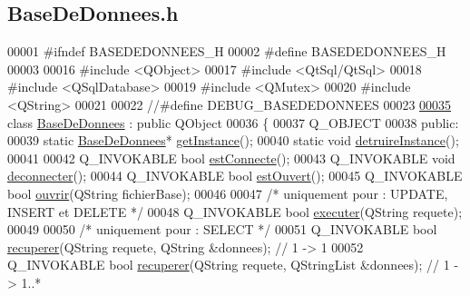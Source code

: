 \hypertarget{_base_de_donnees_8h_source}{}\subsection{Base\+De\+Donnees.\+h}
\label{_base_de_donnees_8h_source}

\begin{DoxyCode}
00001 \textcolor{preprocessor}{#ifndef BASEDEDONNEES\_H}
00002 \textcolor{preprocessor}{#define BASEDEDONNEES\_H}
00003 
00016 \textcolor{preprocessor}{#include <QObject>}
00017 \textcolor{preprocessor}{#include <QtSql/QtSql>}
00018 \textcolor{preprocessor}{#include <QSqlDatabase>}
00019 \textcolor{preprocessor}{#include <QMutex>}
00020 \textcolor{preprocessor}{#include <QString>}
00021 
00022 \textcolor{comment}{//#define DEBUG\_BASEDEDONNEES}
00023 
\hyperlink{class_base_de_donnees}{00035} \textcolor{keyword}{class }\hyperlink{class_base_de_donnees}{BaseDeDonnees} : \textcolor{keyword}{public} QObject
00036 \{
00037     Q\_OBJECT
00038     \textcolor{keyword}{public}:
00039         \textcolor{keyword}{static} \hyperlink{class_base_de_donnees}{BaseDeDonnees}* \hyperlink{class_base_de_donnees_a1cea5a739386ba076c7f265205e82608}{getInstance}();
00040         \textcolor{keyword}{static} \textcolor{keywordtype}{void} \hyperlink{class_base_de_donnees_a457401c0816b888c77ce915997545f4e}{detruireInstance}();
00041 
00042         Q\_INVOKABLE \textcolor{keywordtype}{bool} \hyperlink{class_base_de_donnees_a00388973f3ec42e5c8e76e7af7e124b2}{estConnecte}();
00043         Q\_INVOKABLE \textcolor{keywordtype}{void} \hyperlink{class_base_de_donnees_ae780999d25a26a0e4dbe0706a4785978}{deconnecter}();        
00044         Q\_INVOKABLE \textcolor{keywordtype}{bool} \hyperlink{class_base_de_donnees_af9ac332082ffd0dd35e412cefabe5e9c}{estOuvert}();
00045         Q\_INVOKABLE \textcolor{keywordtype}{bool} \hyperlink{class_base_de_donnees_a7f6a5510b08017b0d99115a84252f186}{ouvrir}(QString fichierBase);
00046 
00047         \textcolor{comment}{/* uniquement pour : UPDATE, INSERT et DELETE */}
00048         Q\_INVOKABLE \textcolor{keywordtype}{bool} \hyperlink{class_base_de_donnees_aa8de5f8f8bb17edc43f5c0ee33712081}{executer}(QString requete);
00049 
00050         \textcolor{comment}{/* uniquement pour : SELECT */}
00051         Q\_INVOKABLE \textcolor{keywordtype}{bool} \hyperlink{class_base_de_donnees_a77539baad389f5acf754cd2cd452403e}{recuperer}(QString requete, QString &donnees); \textcolor{comment}{// 1 -> 1}
00052         Q\_INVOKABLE \textcolor{keywordtype}{bool} \hyperlink{class_base_de_donnees_a77539baad389f5acf754cd2cd452403e}{recuperer}(QString requete, QStringList &donnees); \textcolor{comment}{// 1 -> 1..*}

\end{DoxyCode}
